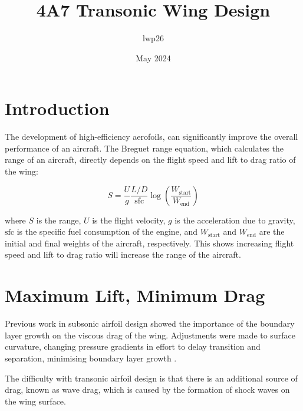 \documentclass{article}
\begin{document}
\title{4A7 Transonic Wing Design}
\author{lwp26}
\date{May 2024}
\maketitle

\section{Introduction}


The development of high-efficiency aerofoils, can significantly improve the overall performance of an aircraft.
The Breguet range equation, which calculates the range of an aircraft, directly depends on the flight speed and lift to drag ratio of the wing:

\begin{equation}
S = \frac{U}{g}\frac{L/D}{\text{sfc}} \log \left( \frac{W_\text{start}}{W_\text{end}} \right)
\end{equation}

where $S$ is the range, $U$ is the flight velocity, $g$ is the acceleration due to gravity, $\text{sfc}$ is the specific fuel consumption of the engine, and $W_\text{start}$ and $W_\text{end}$ are the initial and final weights of the aircraft, respectively.
This shows increasing flight speed and lift to drag ratio will increase the range of the aircraft.

\section{Maximum Lift, Minimum Drag}

Previous work in subsonic airfoil design showed the importance of the boundary layer growth on the viscous drag of the wing.
Adjustments were made to surface curvature, changing pressure gradients in effort to delay transition and separation, minimising boundary layer growth \cite{SA1_report}.

The difficulty with transonic airfoil design is that there is an additional source of drag, known as wave drag, which is caused by the formation of shock waves on the wing surface.


\end{document}
